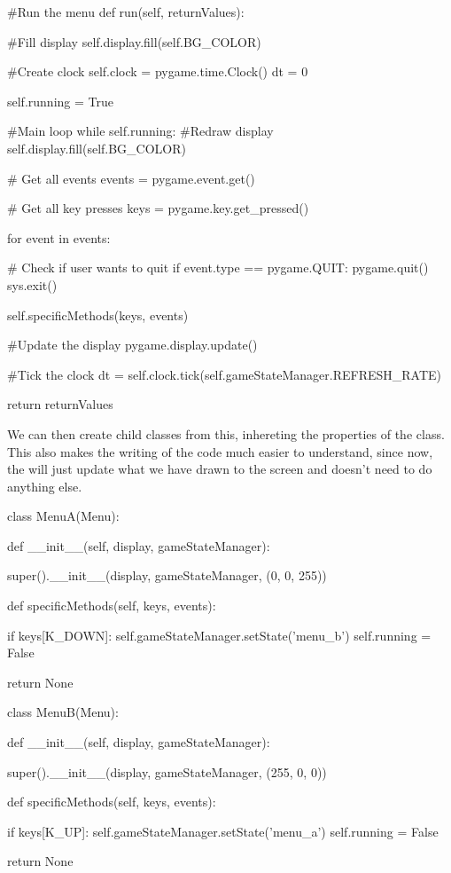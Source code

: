 \begin{mpy}
    #Run the menu
    def run(self, returnValues):

        #Fill display
        self.display.fill(self.BG_COLOR)

        #Create clock
        self.clock = pygame.time.Clock()
        dt = 0

        self.running = True

        #Main loop
        while self.running:
            #Redraw display
            self.display.fill(self.BG_COLOR)

            # Get all events
            events = pygame.event.get()

            # Get all key presses
            keys = pygame.key.get_pressed()

            for event in events:

                # Check if user wants to quit
                if event.type == pygame.QUIT:
                    pygame.quit()
                    sys.exit()


            self.specificMethods(keys, events)


            #Update the display
            pygame.display.update()

            #Tick the clock
            dt = self.clock.tick(self.gameStateManager.REFRESH_RATE)
                
        return returnValues

\end{mpy}

We can then create child classes from this, inhereting the properties of the  class. This also makes the writing of the code much easier to understand, since now, the  will just update what we have drawn to the screen and doesn't need to do anything else.

\begin{mpy}
class MenuA(Menu):

    def __init__(self, display, gameStateManager):

        super().__init__(display, gameStateManager, (0, 0, 255))

    def specificMethods(self, keys, events):

        if keys[K_DOWN]:
            self.gameStateManager.setState('menu_b')
            self.running = False

        return None

class MenuB(Menu):

    def __init__(self, display, gameStateManager):

        super().__init__(display, gameStateManager, (255, 0, 0))

    def specificMethods(self, keys, events):

        if keys[K_UP]:
                self.gameStateManager.setState('menu_a')
                self.running = False

        return None
\end{mpy}

